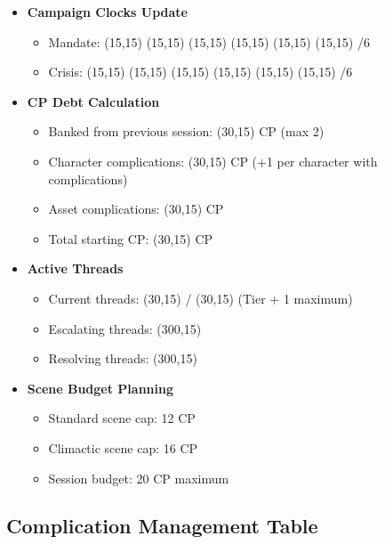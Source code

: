 \documentclass[11pt,letterpaper]{article}
\begin{document}
\begin{itemize}
    \item \textbf{Campaign Clocks Update}
    \begin{itemize}
        \item Mandate: \framebox(15,15){} \framebox(15,15){} \framebox(15,15){} \framebox(15,15){} \framebox(15,15){} \framebox(15,15){} /6
        \item Crisis: \framebox(15,15){} \framebox(15,15){} \framebox(15,15){} \framebox(15,15){} \framebox(15,15){} \framebox(15,15){} /6
    \end{itemize}
    
    \item \textbf{CP Debt Calculation}
    \begin{itemize}
        \item Banked from previous session: \framebox(30,15){} CP (max 2)
        \item Character complications: \framebox(30,15){} CP (+1 per character with complications)
        \item Asset complications: \framebox(30,15){} CP
        \item Total starting CP: \framebox(30,15){} CP
    \end{itemize}
    
    \item \textbf{Active Threads}
    \begin{itemize}
        \item Current threads: \framebox(30,15){} / \framebox(30,15){} (Tier + 1 maximum)
        \item Escalating threads: \framebox(300,15){} 
        \item Resolving threads: \framebox(300,15){}
    \end{itemize}
    
    \item \textbf{Scene Budget Planning}
    \begin{itemize}
        \item Standard scene cap: 12 CP
        \item Climactic scene cap: 16 CP
        \item Session budget: 20 CP maximum
    \end{itemize}
\end{itemize}

\subsection{Complication Management Table}
\end{document}
